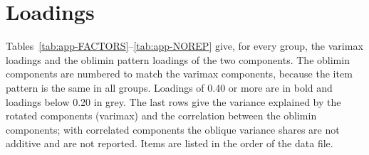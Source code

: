 \documentclass[11pt,a4paper]{article}
\begin{document}
\appendix

\section{Loadings}\label{app:load}

Tables~\ref{tab:app-FACTORS}--\ref{tab:app-NOREP} give, for every group, the varimax loadings and the oblimin pattern loadings of the two components. The oblimin components are numbered to match the varimax components, because the item pattern is the same in all groups. Loadings of 0.40 or more are in bold and loadings below 0.20 in grey. The last rows give the variance explained by the rotated components (varimax) and the correlation between the oblimin components; with correlated components the oblique variance shares are not additive and are not reported. Items are listed in the order of the data file.
\end{document}
